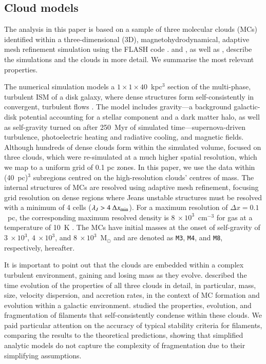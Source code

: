 \documentclass{aa}		%
\begin{document}
\subsection{Cloud models}\label{methods:clouds}

The analysis in this paper is based on a sample of three molecular clouds (MCs) identified within a three-dimensional (3D), magnetohydrodynamical, adaptive mesh refinement simulation using the FLASH code \citep{Fryxell2000}.  
 and , as well as \linebreak \citet[ hereafter]{Chira2018}, describe the simulations and the clouds in more detail. 
We summarise the most relevant properties. 

The numerical simulation models a $1\times1\times40$~kpc$^3$ section of the multi-phase, turbulent ISM of a disk galaxy, where dense structures form self-consistently in convergent, turbulent flows .  
The model includes gravity---a background galactic-disk potential accounting for a stellar component and a dark matter halo, as well as self-gravity turned on after 250~Myr of simulated time---supernova-driven turbulence, photoelectric heating and radiative cooling, and magnetic fields. 
Although hundreds of dense clouds form within the simulated volume,  focused on three clouds, which were re-simulated at a much higher spatial resolution, which we map to a uniform grid of 0.1 pc zones.
In this paper, we use the data within (40~pc)$^{3}$ subregions centred on the high-resolution clouds' centres of mass.
The internal structures of MCs are resolved using adaptive mesh refinement, focusing grid resolution on dense regions where Jeans unstable structures must be resolved with a minimum of 4 cells ($\lambda_J > 4~\Delta x_{\rm min}$).
For a maximum resolution of $\Delta x = 0.1$~pc, the corresponding maximum resolved density is $8~\times 10^3$~cm$^{-3}$ for gas at a temperature of 10~K .
The MCs have initial masses at the onset of self-gravity of $3~\times 10^3$, $4~\times 10^3$, and $8~\times 10^3$~M$_{\odot}$ and are denoted as \texttt{M3}, \texttt{M4}, and \texttt{M8}, respectively, hereafter.

It is important to point out that the clouds are embedded within a complex turbulent environment, gaining and losing mass as they evolve.
 described the time evolution of the properties of all three clouds in detail, in particular, mass, size, velocity dispersion, and accretion rates, in the context of MC formation and evolution within a galactic environment.
 studied the properties, evolution, and fragmentation of filaments that self-consistently condense within these clouds. 
We paid particular attention on the accuracy of typical stability criteria for filaments, comparing the results to the theoretical predictions, showing that simplified analytic models do not capture the complexity of fragmentation due to their simplifying assumptions.
\end{document}
